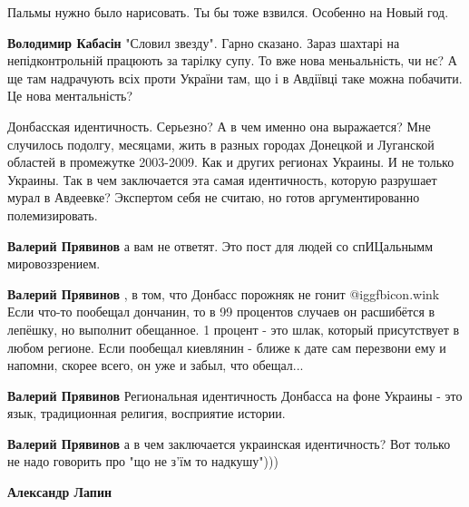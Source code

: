 \begin{itemize}
Пальмы нужно было нарисовать. Ты бы тоже взвился. Особенно на Новый год.

\begin{itemize} %
\textbf{Володимир Кабасін} "Словил звезду". Гарно сказано. Зараз шахтарі на непідконтрольній працюють за тарілку супу. То вже нова меньальність, чи нє? А ще там надрачують всіх проти України там, що і в Авдіївці таке можна побачити. Це нова ментальність?
\end{itemize} %


Донбасская идентичность. Серьезно? А в чем именно она выражается? Мне случилось
подолгу, месяцами, жить в разных городах Донецкой и Луганской областей в
промежутке 2003-2009. Как и других регионах Украины. И не только Украины. Так в
чем заключается эта самая идентичность, которую разрушает мурал в Авдеевке?
Экспертом себя не считаю, но готов аргументированно полемизировать.

\begin{itemize} %
\textbf{Валерий Прявинов} а вам не ответят. Это пост для людей со спИЦальнымм мировоззрением.

\textbf{Валерий Прявинов} , в том, что Донбасс порожняк не гонит  @igg{fbicon.wink}  Если что-то пообещал дончанин, то в 99 процентов случаев он расшибётся в лепёшку, но выполнит обещанное. 1 процент - это шлак, который присутствует в любом регионе. Если пообещал киевлянин - ближе к дате сам перезвони ему и напомни, скорее всего, он уже и забыл, что обещал...

\textbf{Валерий Прявинов} Региональная идентичность Донбасса на фоне Украины - это язык, традиционная религия, восприятие истории.

\textbf{Валерий Прявинов} а в чем заключается украинская идентичность? Вот только не надо говорить про "що не з’їм то надкушу")))

\textbf{Александр Лапин} 


\end{itemize}
\end{itemize}
